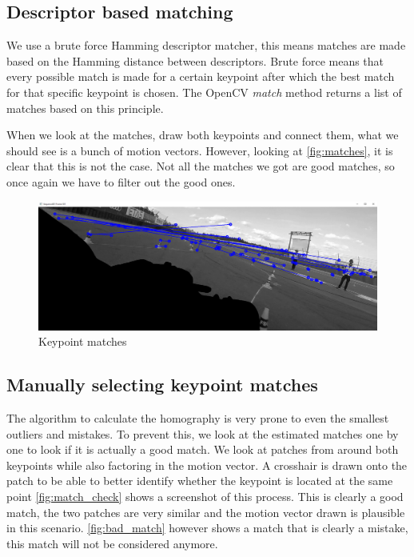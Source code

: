 \subsection{Descriptor based matching}

We use a brute force Hamming descriptor matcher, this means matches are made based on the Hamming distance between descriptors. Brute force means that every possible match is made for a certain keypoint after which the best match for that specific keypoint is chosen. The OpenCV \textit{match} method returns a list of matches based on this principle.\bigskip

When we look at the matches, draw both keypoints and connect them, what we should see is a bunch of motion vectors. However, looking at \autoref{fig:matches}, it is clear that this is not the case. Not all the matches we got are good matches, so once again we have to filter out the good ones.\bigskip

\begin{figure}
    \centering
    \includegraphics[width=1\textwidth]{figures/keypoint_matches.png}
    \caption{Keypoint matches}
    \label{fig:matches}
\end{figure}

\subsection{Manually selecting keypoint matches}
The algorithm to calculate the homography is very prone to even the smallest outliers and mistakes. To prevent this, we look at the estimated matches one by one to look if it is actually a good match. We look at patches from around both keypoints while also factoring in the motion vector. A crosshair is drawn onto the patch to be able to better identify whether the keypoint is located at the same point \autoref{fig:match_check} shows a screenshot of this process. This is clearly a good match, the two patches are very similar and the motion vector drawn is plausible in this scenario. \autoref{fig:bad_match} however shows a match that is clearly a mistake, this match will not be considered anymore.\bigskip

